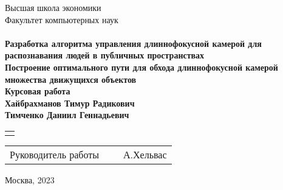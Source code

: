 \pagestyle{empty} %

\begin{center}
    \textup{Высшая школа экономики \\Факультет компьютерных наук}
\\[20mm]
     
 
       \textup{\large\bfseries
         \\[10mm]Разработка алгоритма управления длиннофокусной камерой для распознавания людей в публичных пространствах \\Построение оптимального пути для обхода длиннофокусной камерой множества движущихся объектов\\[15pt]
         Курсовая работа  \\[15pt]
Хайбрахманов Тимур Радикович  \\
Тимченко Даниил Геннадьевич   }\\[30mm]

\begin{tabular}{l}
  \\
 \\[25pt]
\end{tabular}




    \begin{tabular}{p{250pt}p{100pt}p{100pt}} 
        Руководитель работы & &~А.Хельвас\\ [15pt]
        
   \end{tabular}

    \vspace{\fill}
    Москва, 2023


\end{center}